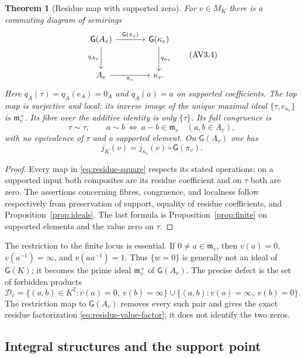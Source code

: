 \documentclass[11pt,a4paper]{article}
\newtheorem{theorem}{Theorem}[section]
\theoremstyle{definition}\newtheorem{definition}[theorem]{Definition}
\newcommand{\G}{\mathsf G}\newcommand{\Tor}{\operatorname{Tor}}\newcommand{\Frac}{\operatorname{Frac}}
\begin{document}
\begin{theorem}[Residue map with supported zero]\label{thm:residue}
For $v\in M_K$ there is a commuting diagram of semirings
\[
\begin{tikzcd}[column sep=large,row sep=large]
 \G(A_v) \arrow[r,"\G(\pi_v)"] \arrow[d,"q_{A_v}"'] &
 \G(\kappa_v) \arrow[d,"q_{\kappa_v}"]\\
 A_v \arrow[r,"\pi_v"'] & \kappa_v .
\end{tikzcd}
\tag{AV3.4}\label{eq:residue-square}
\]
Here $q_A(\tau)=q_A(e_A)=0_A$ and $q_A(a)=a$ on supported coefficients.
The top map is surjective and local: its inverse image of the unique
maximal ideal $\{\tau,e_{\kappa_v}\}$ is
$\mathfrak m_v^+$. Its fibre over the additive identity is only $\{\tau\}$.
Its full congruence is
\[
 \tau\sim\tau,\qquad
 a\sim b\ \Longleftrightarrow\ a-b\in\mathfrak m_v
 \quad(a,b\in A_v),
 \tag{AV3.5}\label{eq:residue-congruence}
\]
with no equivalence of $\tau$ and a supported element.
On $\G(A_v)$ one has
\[
 j_K(v)=j_{\kappa_v}(\overline v)\circ\G(\pi_v).
 \tag{AV3.6}\label{eq:residue-value-factor}
\]
\end{theorem}
\begin{proof}
Every map in \eqref{eq:residue-square} respects its stated operations;
on a supported input both composites are its residue coefficient and
on $\tau$ both are zero. The assertions concerning fibres, congruence,
and localness follow respectively from preservation of support, equality
of residue coefficients, and Proposition~\ref{prop:ideals}.
The last formula is Proposition~\ref{prop:finite} on supported elements
and the value zero on $\tau$.
\end{proof}

The restriction to the finite locus is essential. If $0\ne a\in
\mathfrak m_v$, then $v(a)=0$, $v(a^{-1})=\infty$, and $v(aa^{-1})=1$.
Thus $\{w=0\}$ is generally not an ideal of $\G(K)$; it becomes the
prime ideal $\mathfrak m_v^+$ of $\G(A_v)$. The precise defect is the set
of forbidden products
\[
 \mathcal D_v=\{(a,b)\in K^2:v(a)=0,\ v(b)=\infty\}
 \cup\{(a,b):v(a)=\infty,\ v(b)=0\}.
\]
The restriction map to $\G(A_v)$ removes every such pair and gives the
exact residue factorization \eqref{eq:residue-value-factor}; it does not
identify the two zeros.

\subsection{Integral structures and the support point}
\end{document}
